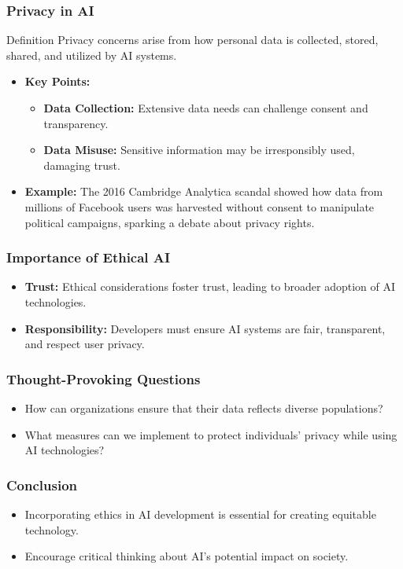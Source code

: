 \documentclass[aspectratio=169]{beamer}
\begin{document}
\begin{frame}[fragile]
    \frametitle{Privacy in AI}
    \begin{block}{Definition}
        Privacy concerns arise from how personal data is collected, stored, shared, and utilized by AI systems.
    \end{block}
    
    \begin{itemize}
        \item \textbf{Key Points:}
        \begin{itemize}
            \item \textbf{Data Collection:} Extensive data needs can challenge consent and transparency.
            \item \textbf{Data Misuse:} Sensitive information may be irresponsibly used, damaging trust.
        \end{itemize}
        \item \textbf{Example:} The 2016 Cambridge Analytica scandal showed how data from millions of Facebook users was harvested without consent to manipulate political campaigns, sparking a debate about privacy rights.
    \end{itemize}
\end{frame}

\begin{frame}[fragile]
    \frametitle{Importance of Ethical AI}
    \begin{itemize}
        \item \textbf{Trust:} Ethical considerations foster trust, leading to broader adoption of AI technologies.
        \item \textbf{Responsibility:} Developers must ensure AI systems are fair, transparent, and respect user privacy.
    \end{itemize}
\end{frame}

\begin{frame}[fragile]
    \frametitle{Thought-Provoking Questions}
    \begin{itemize}
        \item How can organizations ensure that their data reflects diverse populations?
        \item What measures can we implement to protect individuals' privacy while using AI technologies?
    \end{itemize}
\end{frame}

\begin{frame}[fragile]
    \frametitle{Conclusion}
    \begin{itemize}
        \item Incorporating ethics in AI development is essential for creating equitable technology.
        \item Encourage critical thinking about AI's potential impact on society.
    \end{itemize}
\end{frame}
\end{document}
